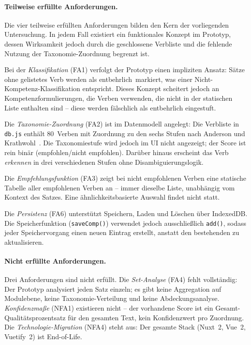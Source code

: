 \paragraph{Teilweise erfüllte Anforderungen.}

Die vier teilweise erfüllten Anforderungen bilden den Kern der vorliegenden Untersuchung.
In jedem Fall existiert ein funktionales Konzept im Prototyp, dessen Wirksamkeit jedoch durch die geschlossene Verbliste und die fehlende Nutzung der Taxonomie-Zuordnung begrenzt ist.

Bei der \emph{Klassifikation} (FA1) verfolgt der Prototyp einen impliziten Ansatz: Sätze ohne gelistetes Verb werden als \glqq entbehrlich\grqq\ markiert, was einer Nicht-Kompetenz-Klassifikation entspricht.
Dieses Konzept scheitert jedoch an Kompetenzformulierungen, die Verben verwenden, die nicht in der statischen Liste enthalten sind -- diese werden fälschlich als entbehrlich eingestuft.

Die \emph{Taxonomie-Zuordnung} (FA2) ist im Datenmodell angelegt: Die Verbliste in \texttt{db.js} enthält 80~Verben mit Zuordnung zu den sechs Stufen nach Anderson und Krathwohl~\cite{anderson2001taxonomy}.
Die Taxonomiestufe wird jedoch im UI nicht angezeigt; der Score ist rein binär (empfohlen/nicht empfohlen).
Darüber hinaus erscheint das Verb \emph{erkennen} in drei verschiedenen Stufen ohne Disambiguierungslogik.

Die \emph{Empfehlungsfunktion} (FA3) zeigt bei nicht empfohlenen Verben eine statische Tabelle aller empfohlenen Verben an -- immer dieselbe Liste, unabhängig vom Kontext des Satzes.
Eine ähnlichkeitsbasierte Auswahl findet nicht statt.

Die \emph{Persistenz} (FA6) unterstützt Speichern, Laden und Löschen über IndexedDB.
Die Speicherfunktion (\texttt{saveComp()}) verwendet jedoch ausschließlich \texttt{add()}, sodass jeder Speichervorgang einen neuen Eintrag erstellt, anstatt den bestehenden zu aktualisieren.

\paragraph{Nicht erfüllte Anforderungen.}

Drei Anforderungen sind nicht erfüllt.
Die \emph{Set-Analyse} (FA4) fehlt vollständig: Der Prototyp analysiert jeden Satz einzeln; es gibt keine Aggregation auf Modulebene, keine Taxonomie-Verteilung und keine Abdeckungsanalyse.
\emph{Konfidenzmaße} (NFA1) existieren nicht -- der vorhandene Score ist ein Gesamt-Qualitätsprozentsatz für den gesamten Text, kein Konfidenzwert pro Zuordnung.
Die \emph{Technologie-Migration} (NFA4) steht aus: Der gesamte Stack (Nuxt~2, Vue~2, Vuetify~2) ist End-of-Life.

